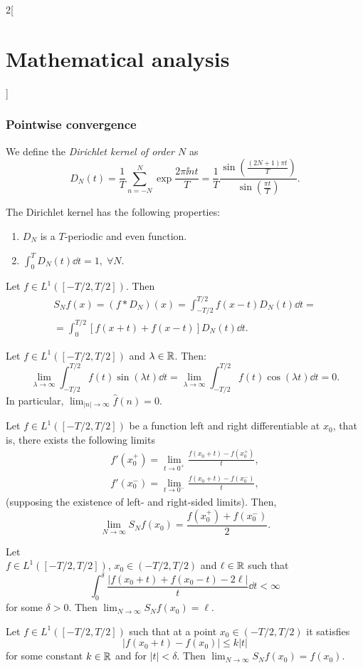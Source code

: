 \documentclass[../../../main.tex]{subfiles}
\begin{document}
\begin{multicols}{2}[\section{Mathematical analysis}]
  \subsubsection{Pointwise convergence}
  \begin{definition}
    We define the \textit{Dirichlet kernel of order $N$} as $$D_N(t)=\frac{1}{T}\sum_{n=-N}^N\exp{\frac{2\pi\ii nt}{T}}=\frac{1}{T}\frac{\sin\left(\frac{(2N+1)\pi t}{T}\right)}{\sin\left(\frac{\pi t}{T}\right)}.$$
  \end{definition}
  \begin{prop}
    The Dirichlet kernel has the following properties:
    \begin{enumerate}
      \item $D_N$ is a $T$-periodic and even function.
      \item $\displaystyle\int_0^TD_N(t)\dd t=1,\;\forall N$.
    \end{enumerate}
  \end{prop}
  \begin{prop}
    Let $f\in L^1([-T/2,T/2])$. Then
    \begin{multline*}
      S_Nf(x)=(f*D_N)(x)=\int_{-T/2}^{T/2}f(x-t)D_N(t)\dd t=\\=\int_0^{T/2}[f(x+t)+f(x-t)]D_N(t)\dd t.
    \end{multline*}
  \end{prop}
  \begin{lemma}
    Let $f\in L^1([-T/2,T/2])$ and $\lambda\in\mathbb{R} $. Then: $$\lim_{\lambda\to\infty}\int_{-T/2}^{T/2}f(t)\sin(\lambda t)\dd t=\lim_{\lambda\to\infty}\int_{-T/2}^{T/2}f(t)\cos(\lambda t)\dd t=0.$$ In particular, $\displaystyle\lim_{|n|\to\infty}\widehat{f}(n)=0$.
  \end{lemma}
  \begin{theorem}
    Let $f\in L^1([-T/2,T/2])$ be a function left and right differentiable at $x_0$, that is, there exists the following limits
    \begin{gather*}f'(x_0^+)=\lim_{t\to0^+}\frac{f(x_0+t)-f(x_0^+)}{t},\\ f'(x_0^-)=\lim_{t\to0^-}\frac{f(x_0+t)-f(x_0^-)}{t},\end{gather*}(supposing the existence of left- and right-sided limits). Then, $$\lim_{N\to\infty}S_Nf(x_0)=\frac{f(x_0^+)+f(x_0^-)}{2}.$$
  \end{theorem}
  \begin{theorem}
    Let \\$f\in L^1([-T/2,T/2])$, $x_0\in (-T/2,T/2)$ and $\ell\in\mathbb{R} $ such that $$\int_0^\delta\frac{|f(x_0+t)+f(x_0-t)-2\ell|}{t}\dd t<\infty$$ for some $\delta>0$. Then $\displaystyle\lim_{N\to\infty}S_Nf(x_0)=\ell$.
  \end{theorem}
  \begin{theorem}
    Let $f\in L^1([-T/2,T/2])$ such that at a point $x_0\in (-T/2,T/2)$ it satisfies $$|f(x_0+t)-f(x_0)|\leq k|t|$$ for some constant $k\in\mathbb{R} $ and for $|t|<\delta$. Then $\displaystyle\lim_{N\to\infty}S_Nf(x_0)=f(x_0)$.
  \end{theorem}

\end{multicols}
\end{document}

